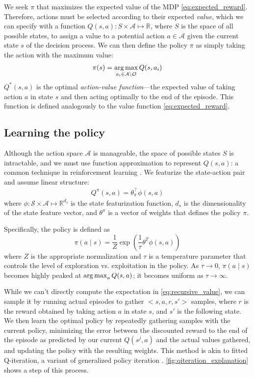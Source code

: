 We seek $\pi$ that maximizes the expected value of the MDP \eqref{eq:expected_reward}.
Therefore, actions must be selected according to their expected \emph{value}, which we can specify with a function $Q(s,a): S \times \mathcal{A} \mapsto \mathbb{R}$, where $S$ is the space of all possible states, to assign a value to a potential action $a \in \mathcal{A}$ given the current state $s$ of the decision process.
We can then define the policy $\pi$ as simply taking the action with the maximum value:
\begin{align}
\pi(s) = \operatorname*{arg\,max}_{a_i \in \mathcal{A} \setminus \mathcal{O}} Q(s,a_i)
\end{align}
$Q^*(s,a)$ is the optimal \emph{action-value function}---the expected value of taking action $a$ in state $s$ and then acting optimally to the end of the episode.
This function is defined analogously to the value function \eqref{eq:expected_reward}.

\subsection{Learning the policy}
Although the action space $\mathcal{A}$ is manageable, the space of possible states $S$ is intractable, and we must use function approximation to represent $Q(s,a)$: a common technique in reinforcement learning \cite{Sutton1998}.
We featurize the state-action pair and assume linear structure:
\begin{align}
Q^\pi(s,a) = \theta_\pi^\top \phi(s,a)
\end{align}
where $\phi: \mathcal{S} \times \mathcal{A} \mapsto \mathbb{R}^{d_s}$ is the state featurization function, $d_s$ is the dimensionality of the state feature vector, and $\theta^\pi$ is a vector of weights that defines the policy $\pi$.

Specifically, the policy is defined as
\begin{equation}
\pi(a \mid s) = \frac{1}{Z} \exp\left(\frac{1}{\tau} \theta^T \phi(s, a)\right)
\end{equation}
where $Z$ is the appropriate normalization and $\tau$ is a temperature parameter that controls the level of exploration vs. exploitation in the policy.
As $\tau \rightarrow 0$, ${\pi(a \mid s)}$ becomes highly peaked at $\operatorname*{arg\,max}_a Q(s,a)$; it becomes uniform as $\tau \rightarrow \infty$.



While we can't directly compute the expectation in \eqref{eq:recursive_value}, we can sample it by running actual episodes to gather $<s,a,r,s'>$ samples, where $r$ is the reward obtained by taking action $a$ in state $s$, and $s'$ is the following state.
We then learn the optimal policy by repeatedly gathering samples with the current policy, minimizing the error between the discounted reward to the end of the episode as predicted by our current $Q(s^j,a)$ and the actual values gathered, and updating the policy with the resulting weights.
This method is akin to fitted Q-iteration, a variant of generalized policy iteration \cite{Ernst2005,Sutton1998}.
\autoref{fig:qiteration_explanation} shows a step of this process.

